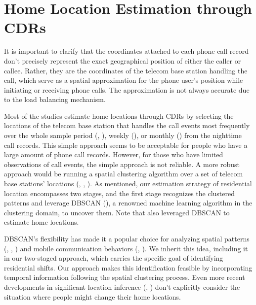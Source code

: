 \section{Home Location Estimation through CDRs}\label{sec:2_home_location_estimation_through_cdrs}
It is important to clarify that the coordinates attached to each phone call record don't precisely represent the exact geographical position of either the caller or callee.
Rather, they are the coordinates of the telecom base station handling the call, which serve as a spatial approximation for the phone user's position while initiating or receiving phone calls.
The approximation is not always accurate due to the load balancing mechanism.

Most of the studies estimate home locations through CDRs by selecting the locations of the telecom base station that handles the call events most frequently over the whole sample period (\cite{cho2011friendship}, \cite{phithakkitnukoon2012socio}), weekly (\cite{referral_effect_2023aer}), or monthly (\cite{phithakkitnukoon2022inferring}) from the nighttime call records.
This simple approach seems to be acceptable for people who have a large amount of phone call records. However, for those who have limited observations of call events, the simple approach is not reliable.
A more robust approach would be running a spatial clustering algorithm over a set of telecom base stations' locations (\cite{isaacman2011identifying}, \cite{yang2014identifying}, \cite{ayesha2019user}).
As mentioned, our estimation strategy of residential location encompasses two stages, and the first stage recognizes the clustered patterns and leverage DBSCAN (\cite{ester1996density}), a renowned machine learning algorithm in the clustering domain, to uncover them. Note that \cite{ayesha2019user} also leveraged DBSCAN to estimate home locations.


DBSCAN's flexibility has made it a popular choice for analyzing spatial patterns (\cite{yang2014identifying}, \cite{shi2014density}, \cite{dominguez2017sensing}) and mobile communication behaviors (\cite{karahoca2006comparing}, \cite{jabbar2020fraud}).
We inherit this idea, including it in our two-staged approach, which carries the specific goal of identifying residential shifts.
Our approach makes this identification feasible by incorporating temporal information following the spatial clustering process.
Even more recent developments in significant location inference (\cite{tongsinoot2017exploring}, \cite{luo2020research}) don't explicitly consider the situation where people might change their home locations.


